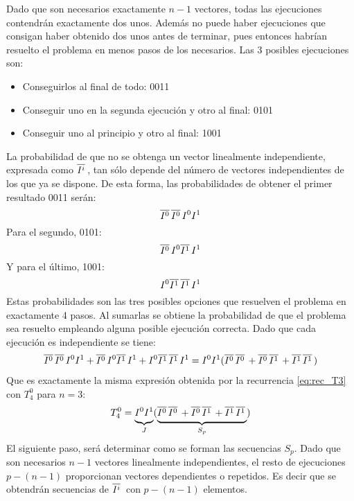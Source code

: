 Dado que son necesarios exactamente $n-1$ vectores, todas las ejecuciones 
contendrán exactamente dos unos.  Además no puede haber ejecuciones que consigan 
haber obtenido dos unos antes de terminar, pues entonces habrían resuelto el 
problema en menos pasos de los necesarios.  Las 3 posibles ejecuciones son:
\begin{itemize}
\item Conseguirlos al final de todo: 0011
\item Conseguir uno en la segunda ejecución y otro al final: 0101
\item Conseguir uno al principio y otro al final: 1001
\end{itemize}
La probabilidad de que no se obtenga un vector linealmente independiente, 
expresada como $\overline{I^{i}}\,$, tan sólo depende del número de vectores independientes 
de los que ya se dispone. De esta forma, las probabilidades de obtener el primer 
resultado 0011 serán:
$$ \overline{I^{0}}\, \overline{I^{0}}\, I^0 I^1 $$
Para el segundo, 0101:
$$ \overline{I^{0}}\, I^0 \overline{I^{1}}\, I^1 $$
Y para el último, 1001:
$$ I^0 \overline{I^{1}}\, \overline{I^{1}}\, I^1 $$
Estas probabilidades son las tres posibles opciones que resuelven el problema en 
exactamente 4 pasos. Al sumarlas se obtiene la probabilidad de que el problema 
sea resuelto empleando alguna posible ejecución correcta. Dado que cada 
ejecución es independiente se tiene:
\begin{equation}
\begin{split}
\overline{I^{0}}\, \overline{I^{0}}\, I^0 I^1 + \overline{I^{0}}\, I^0 \overline{I^{1}}\, I^1 + I^0 \overline{I^{1}}\, \overline{I^{1}}\, I^1 =
I^0I^1(\overline{I^{0}}\, \overline{I^{0}}\, + \overline{I^{0}}\, \overline{I^{1}}\,  + \overline{I^{1}}\, \overline{I^{1}}\, )
\end{split}
\end{equation}
Que es exactamente la misma expresión obtenida por la recurrencia 
\eqref{eq:rec_T3} con $T^0_4$ para $n=3$:
%
$$
	T^0_4 = \underbrace{
\vphantom{\big(}
I^0I^1
}_J
	(\underbrace{
\vphantom{\big(}
\overline{I^{0}}\, \overline{I^{0}}\, + \overline{I^{0}}\, \overline{I^{1}}\,  + \overline{I^{1}}\, \overline{I^{1}}\,
}_{S_p}) $$
%
El siguiente paso, será determinar como se forman las secuencias $S_p$.
Dado que son necesarios $n-1$ vectores linealmente independientes, el resto de 
ejecuciones $p - (n-1)$ proporcionan vectores dependientes o repetidos. Es decir 
que se obtendrán secuencias de $\overline{I^{i}}\,$ con $p - (n-1)$ elementos.

